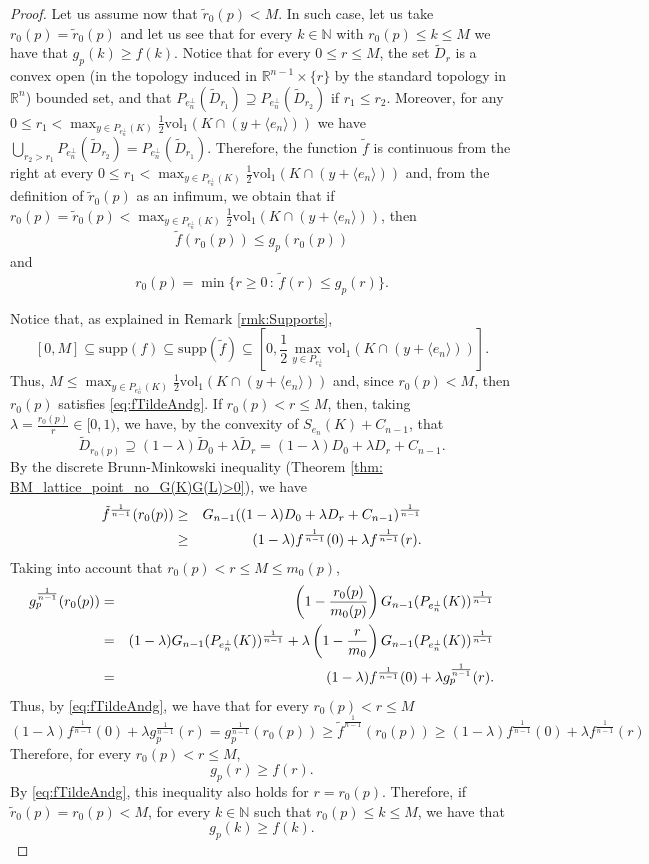 \documentclass[10pt]{amsart}
\def\R{\mathbb{R}}
\def\N{\mathbb{N}}
\def\vol{\mathrm{vol}}
\numberwithin{equation}{section}
\begin{document}
\begin{proof}
Let us assume now that $\tilde{r}_0(p)<M$. In such case, let us take $r_0(p)=\tilde{r}_0(p)$ and let us see that for every $k\in\N$ with $r_0(p)\leq k\leq M$ we have that $g_p(k)\geq f(k)$. Notice that for every $0\leq r\leq M$, the set $\tilde{D}_r$ is a convex open (in the topology induced in $\R^{n-1}\times\{r\}$ by the standard topology in $\R^n$) bounded set, and that $P_{e_n^\perp}(\tilde{D}_{r_1})\supseteq P_{e_n^\perp}(\tilde{D}_{r_2})$ if $r_1\leq r_2$. Moreover, for any $0\leq r_1<\max_{y\in P_{e_n^\perp}(K)}\frac{1}{2}\vol_1(K\cap(y+\langle e_n\rangle))$ we have $\displaystyle{\bigcup_{r_2>r_1}P_{e_n^\perp}(\tilde{D}_{r_2})=P_{e_n^\perp}(\tilde{D}_{r_1})}$. Therefore, the function $\tilde{f}$ is continuous from the right at every $0\leq r_1<\max_{y\in P_{e_n^\perp}(K)}\frac{1}{2}\vol_1(K\cap(y+\langle e_n\rangle))$ and, from the definition of $\tilde{r}_0(p)$ as an infimum, we obtain that if $r_0(p)=\tilde{r}_0(p)<\max_{y\in P_{e_n^\perp}(K)}\frac{1}{2}\vol_1(K\cap(y+\langle e_n\rangle))$, then
\begin{equation}\label{eq:fTildeAndg}
\tilde{f}(r_0(p))\leq g_p(r_0(p))
\end{equation}
and
$$
r_0(p)=\min\{r\geq0\,:\,\tilde{f}(r)\leq g_p(r)\}.
$$

Notice that, as explained in Remark \ref{rmk:Supports},
$$
[0,M]\subseteq\textrm{supp}(f)\subseteq\textrm{supp}(\tilde{f})\subseteq\left[0,\frac{1}{2}\max_{y\in P_{e_n^\perp}}\vol_1(K\cap(y+\langle e_n\rangle))\right].
$$
Thus, $M\leq \max_{y\in P_{e_n^\perp}(K)}\frac{1}{2}\vol_1(K\cap(y+\langle e_n\rangle))$ and, since $r_0(p)<M$, then $r_0(p)$ satisfies \eqref{eq:fTildeAndg}. If $r_0(p)< r\leq M$, then, taking $\lambda=\frac{r_0(p)}{r}\in[0,1)$, we have, by the convexity of $S_{e_n}(K)+C_{n-1}$, that
$$
\tilde{D}_{r_0(p)}\supseteq (1-\lambda)\tilde{D}_0+\lambda \tilde{D}_r=(1-\lambda)D_0+\lambda D_r+C_{n-1}.
$$
By the discrete Brunn-Minkowski inequality (Theorem \ref{thm: BM_lattice_point_no_G(K)G(L)>0}), we have
\begin{eqnarray*}
\tilde{f}^\frac{1}{n-1}(r_0(p))&\geq&G_{n-1}((1-\lambda)D_0+\lambda D_r+C_{n-1})^\frac{1}{n-1}\cr
&\geq&(1-\lambda)f^\frac{1}{n-1}(0)+\lambda f^\frac{1}{n-1}(r).
\end{eqnarray*}
Taking into account that $r_0(p)<r\leq M\leq m_0(p)$,
\begin{eqnarray*}
g_p^\frac{1}{n-1}(r_0(p))&=&\left(1-\frac{r_0(p)}{m_0(p)}\right)G_{n-1}(P_{e_n^\perp}(K))^\frac{1}{n-1}\cr
&=&(1-\lambda)G_{n-1}(P_{e_n^\perp}(K))^\frac{1}{n-1}+\lambda\left(1-\frac{r}{m_0}\right)G_{n-1}(P_{e_n^\perp}(K))^\frac{1}{n-1}\cr
&=&(1-\lambda)f^\frac{1}{n-1}(0)+\lambda g_p^\frac{1}{n-1}(r).\cr
\end{eqnarray*}
Thus, by \eqref{eq:fTildeAndg}, we have that for every $r_0(p)<r\leq M$
$$
(1-\lambda)f^\frac{1}{n-1}(0)+\lambda g_p^\frac{1}{n-1}(r)=g_p^\frac{1}{n-1}(r_0(p))\geq \tilde{f}^\frac{1}{n-1}(r_0(p))\geq (1-\lambda)f^\frac{1}{n-1}(0)+\lambda f^\frac{1}{n-1}(r)
$$
Therefore, for every $r_0(p)<r\leq M$,
$$
g_p(r)\geq f(r).
$$
By \eqref{eq:fTildeAndg}, this inequality also holds for $r=r_0(p)$. Therefore, if $\tilde{r}_0(p)=r_0(p)<M$, for every $k\in\N$ such that $r_0(p)\leq k\leq M$, we have that
$$
g_p(k)\geq f(k).
$$
\end{proof}
\end{document}
